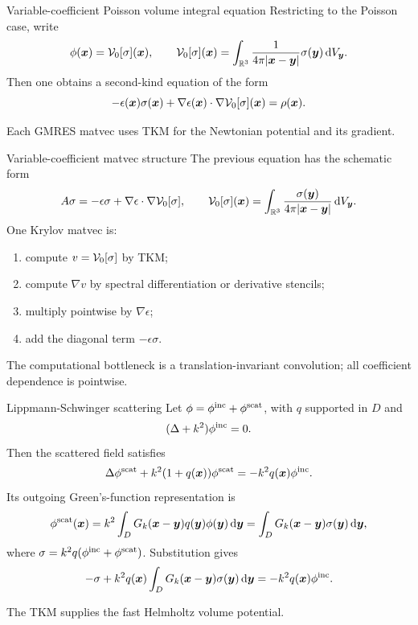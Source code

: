 \documentclass[aspectratio=169,11pt]{beamer}
\newcommand{\R}{\mathbb{R}}
\newcommand{\dd}{\,\mathrm d}
\newcommand{\x}{\bm{x}}
\newcommand{\y}{\bm{y}}
\begin{document}
\begin{frame}{Variable-coefficient Poisson volume integral equation}
\small
Restricting to the Poisson case, write
\[
  \phi(\x)=\Vop_0[\sigma](\x),
  \qquad
  \Vop_0[\sigma](\x)=
  \int_{\R^3}\frac{1}{4\pi|\x-\y|}
  \sigma(\y)\dd V_{\y}.
\]
Then one obtains a second-kind equation of the form
\[
  -\epsilon(\x)\sigma(\x)
  +
  \nabla\epsilon(\x)\cdot
  \nabla\Vop_0[\sigma](\x)
  =
  \rho(\x).
\]

\vspace{1mm}
Each GMRES matvec uses TKM for the Newtonian potential and its gradient.
\end{frame}

\begin{frame}{Variable-coefficient matvec structure}
\small
The previous equation has the schematic form
\[
  A\sigma
  =
  -\epsilon\sigma+\nabla\epsilon\cdot\nabla \Vop_0[\sigma],
  \qquad
  \Vop_0[\sigma](\x)=
  \int_{\R^3}\frac{\sigma(\y)}{4\pi|\x-\y|}\dd V_{\y}.
\]
One Krylov matvec is:
\begin{enumerate}
  \item compute $v=\mathcal{V}_0[\sigma]$ by TKM;
  \item compute $\nabla v$ by spectral differentiation or derivative stencils;
  \item multiply pointwise by $\nabla\epsilon$;
  \item add the diagonal term $-\epsilon\sigma$.
\end{enumerate}

\vspace{1mm}
The computational bottleneck is a translation-invariant convolution; all
coefficient dependence is pointwise.
\end{frame}

\begin{frame}{Lippmann-Schwinger scattering}
\small
Let $\phi=\phi^{\rm inc}+\phi^{\rm scat}$, with $q$ supported in $D$ and
\[
  (\Delta+k^2)\phi^{\rm inc}=0.
\]
Then the scattered field satisfies
\[
  \Delta\phi^{\rm scat}+k^2(1+q(\x))\phi^{\rm scat}
  =
  -k^2q(\x)\phi^{\rm inc}.
\]
Its outgoing Green's-function representation is
\[
  \phi^{\rm scat}(\x)
  =
  k^2\int_D G_k(\x-\y)q(\y)\phi(\y)\dd\y
  =
  \int_D G_k(\x-\y)\sigma(\y)\dd\y,
\]
where $\sigma=k^2q(\phi^{\rm inc}+\phi^{\rm scat})$.  Substitution gives
\[
  -\sigma+k^2q(\x)\int_D G_k(\x-\y)\sigma(\y)\dd\y
  =
  -k^2q(\x)\phi^{\rm inc}.
\]

\vspace{2mm}
The TKM supplies the fast Helmholtz volume potential.
\end{frame}
\end{document}
